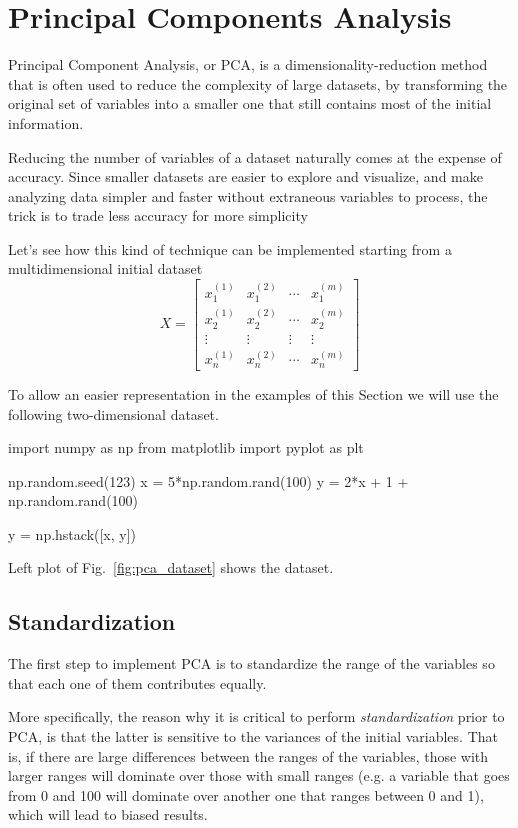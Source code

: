 \section{Principal Components Analysis}
\label{sec:pca}

Principal Component Analysis, or PCA, is a dimensionality-reduction method that is often used to reduce the complexity of large datasets, by transforming the original set of variables into a smaller one that still contains most of the initial information.

Reducing the number of variables of a dataset naturally comes at the expense of accuracy. Since smaller datasets are easier to explore and visualize, and make analyzing data simpler and faster without extraneous variables to process, the trick is to trade less accuracy for more simplicity

Let's see how this kind of technique can be implemented starting from 
a multidimensional initial dataset 
\begin{equation}
X=\begin{bmatrix}
x^{(1)}_1 &x^{(2)}_1&\cdots &x^{(m)}_1 \\
x^{(1)}_2 &x^{(2)}_2&\cdots &x^{(m)}_2 \\
\vdots &\vdots &\vdots &\vdots \\
x^{(1)}_n &x^{(2)}_n&\cdots &x^{(m)}_n 
\end{bmatrix}
\end{equation}

To allow an easier representation in the examples of this Section we will use the following two-dimensional dataset.

\begin{ipython}
import numpy as np
from matplotlib import pyplot as plt
	
np.random.seed(123)
x = 5*np.random.rand(100)
y = 2*x + 1 + np.random.rand(100)

y = np.hstack([x, y])
\end{ipython}

Left plot of Fig.~\ref{fig:pca_dataset} shows the dataset.

\subsection{Standardization}
The first step to implement PCA is to standardize the range of the variables so that each one of them contributes equally.

More specifically, the reason why it is critical to perform \emph{standardization} prior to PCA, is that the latter is sensitive to the variances of the initial variables. That is, if there are large differences between the ranges of the variables, those with larger ranges will dominate over those with small ranges (e.g. a variable that goes from 0 and 100 will dominate over another one that ranges between 0 and 1), which will lead to biased results. 

